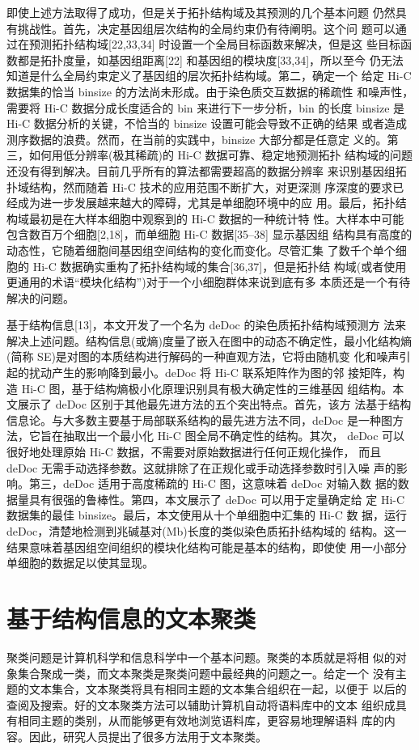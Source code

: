 \documentclass[a4paper]{apa6}
\begin{document}
即使上述方法取得了成功，但是关于拓扑结构域及其预测的几个基本问题 仍然具有挑战性。首先，决定基因组层次结构的全局约束仍有待阐明。这个问 题可以通过在预测拓扑结构域[22,33,34] 时设置一个全局目标函数来解决，但是这 些目标函数都是拓扑度量，如基因组距离[22] 和基因组的模块度[33,34]，所以至今 仍无法知道是什么全局约束定义了基因组的层次拓扑结构域。第二，确定一个 给定 Hi-C 数据集的恰当 binsize 的方法尚未形成。由于染色质交互数据的稀疏性 和噪声性，需要将 Hi-C 数据分成长度适合的 bin 来进行下一步分析，bin 的长度 binsize 是 Hi-C 数据分析的关键，不恰当的 binsize 设置可能会导致不正确的结果 或者造成测序数据的浪费。然而，在当前的实践中，binsize 大部分都是任意定 义的。第三，如何用低分辨率(极其稀疏)的 Hi-C 数据可靠、稳定地预测拓扑 结构域的问题还没有得到解决。目前几乎所有的算法都需要超高的数据分辨率 来识别基因组拓扑域结构，然而随着 Hi-C 技术的应用范围不断扩大，对更深测 序深度的要求已经成为进一步发展越来越大的障碍，尤其是单细胞环境中的应 用。最后，拓扑结构域最初是在大样本细胞中观察到的 Hi-C 数据的一种统计特 性。大样本中可能包含数百万个细胞[2,18]，而单细胞 Hi-C 数据[35–38] 显示基因组 结构具有高度的动态性，它随着细胞间基因组空间结构的变化而变化。尽管汇集 了数千个单个细胞的 Hi-C 数据确实重构了拓扑结构域的集合[36,37]，但是拓扑结 构域(或者使用更通用的术语“模块化结构”)对于一个小细胞群体来说到底有多 本质还是一个有待解决的问题。

基于结构信息[13]，本文开发了一个名为 deDoc 的染色质拓扑结构域预测方 法来解决上述问题。结构信息(或熵)度量了嵌入在图中的动态不确定性，最小化结构熵(简称 SE)是对图的本质结构进行解码的一种直观方法，它将由随机变 化和噪声引起的扰动产生的影响降到最小。deDoc 将 Hi-C 联系矩阵作为图的邻 接矩阵，构造 Hi-C 图，基于结构熵极小化原理识别具有极大确定性的三维基因 组结构。本文展示了 deDoc 区别于其他最先进方法的五个突出特点。首先，该方 法基于结构信息论。与大多数主要基于局部联系结构的最先进方法不同，deDoc 是一种图方法，它旨在抽取出一个最小化 Hi-C 图全局不确定性的结构。其次， deDoc 可以很好地处理原始 Hi-C 数据，不需要对原始数据进行任何正规化操作， 而且 deDoc 无需手动选择参数。这就排除了在正规化或手动选择参数时引入噪 声的影响。第三，deDoc 适用于高度稀疏的 Hi-C 图，这意味着 deDoc 对输入数 据的数据量具有很强的鲁棒性。第四，本文展示了 deDoc 可以用于定量确定给 定 Hi-C 数据集的最佳 binsize。最后，本文使用从十个单细胞中汇集的 Hi-C 数 据，运行 deDoc，清楚地检测到兆碱基对(Mb)长度的类似染色质拓扑结构域的 结构。这一结果意味着基因组空间组织的模块化结构可能是基本的结构，即使使 用一小部分单细胞的数据足以使其显现。

\section{基于结构信息的文本聚类}
\label{sec:org3665566}
聚类问题是计算机科学和信息科学中一个基本问题。聚类的本质就是将相 似的对象集合聚成一类，而文本聚类是聚类问题中最经典的问题之一。给定一个 没有主题的文本集合，文本聚类将具有相同主题的文本集合组织在一起，以便于 以后的查阅及搜索。好的文本聚类方法可以辅助计算机自动将语料库中的文本 组织成具有相同主题的类别，从而能够更有效地浏览语料库，更容易地理解语料 库的内容。因此，研究人员提出了很多方法用于文本聚类。
\end{document}
